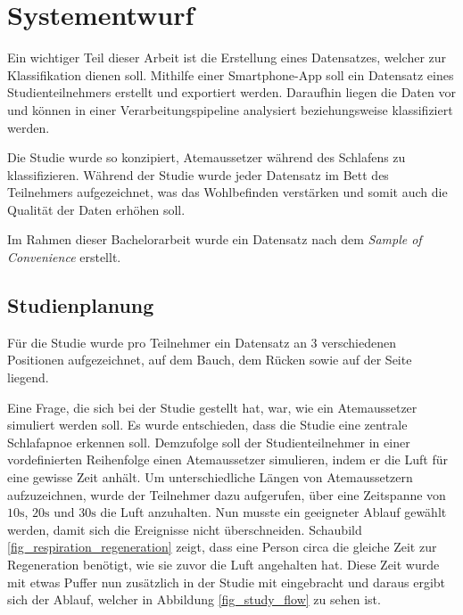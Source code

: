 \chapter{Systementwurf}
\label{ch:Design}

Ein wichtiger Teil dieser Arbeit ist die Erstellung eines Datensatzes, welcher zur Klassifikation dienen soll.
Mithilfe einer Smartphone-App soll ein Datensatz eines Studienteilnehmers erstellt und exportiert werden. 
Daraufhin liegen die Daten vor und können in einer Verarbeitungspipeline analysiert beziehungsweise klassifiziert werden.

Die Studie wurde so konzipiert, Atemaussetzer während des Schlafens zu klassifizieren. 
Während der Studie wurde jeder Datensatz im Bett des Teilnehmers aufgezeichnet, was das Wohlbefinden verstärken und somit auch die Qualität der Daten erhöhen soll.

Im Rahmen dieser Bachelorarbeit wurde ein Datensatz  nach dem \textit{Sample of Convenience} erstellt.

\section{Studienplanung}
\label{ch:Design:sec:studienplanung}
Für die Studie wurde pro Teilnehmer ein Datensatz an 3 verschiedenen Positionen aufgezeichnet, auf dem Bauch, dem Rücken sowie auf der Seite liegend.

Eine Frage, die sich bei der Studie gestellt hat, war, wie ein Atemaussetzer {\glqq simuliert\grqq} werden soll. 
Es wurde entschieden, dass die Studie eine zentrale Schlafapnoe erkennen soll. 
Demzufolge soll der Studienteilnehmer in einer vordefinierten Reihenfolge einen Atemaussetzer {\glqq simulieren\grqq}, indem er die Luft für eine gewisse Zeit anhält.
Um unterschiedliche Längen von Atemaussetzern aufzuzeichnen, wurde der Teilnehmer dazu aufgerufen, über eine Zeitspanne von $10\si{\s}$, $20\si{\s}$ und $30\si{\s}$ die Luft anzuhalten.
Nun musste ein geeigneter Ablauf gewählt werden, damit sich die Ereignisse nicht überschneiden.
Schaubild \ref{fig_respiration_regeneration} zeigt, dass eine Person circa die gleiche Zeit zur Regeneration benötigt, wie sie zuvor die Luft angehalten hat.
Diese Zeit wurde mit etwas Puffer nun zusätzlich in der Studie mit eingebracht und daraus ergibt sich der Ablauf, welcher in Abbildung \ref{fig_study_flow} zu sehen ist.


